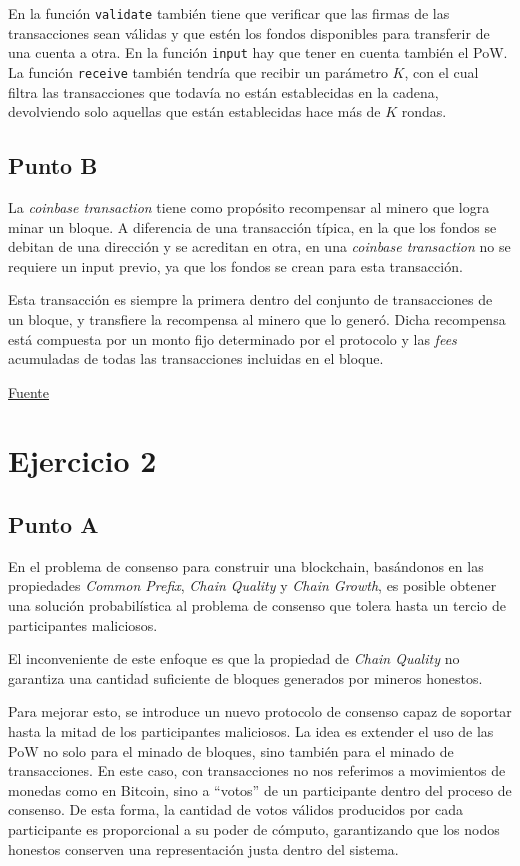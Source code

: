 \documentclass[12pt]{article}
\begin{document}
En la función \texttt{validate} también tiene que verificar que las firmas de las transacciones sean válidas y que estén los fondos disponibles para transferir de una cuenta a otra.  
En la función \texttt{input} hay que tener en cuenta también el PoW.  
La función \texttt{receive} también tendría que recibir un parámetro $K$, con el cual filtra las transacciones que todavía no están establecidas en la cadena, devolviendo solo aquellas que están establecidas hace más de $K$ rondas.  

\subsection{Punto B}

La \emph{coinbase transaction} tiene como propósito recompensar al minero que logra minar un bloque.  
A diferencia de una transacción típica, en la que los fondos se debitan de una dirección y se acreditan en otra, en una \emph{coinbase transaction} no se requiere un input previo, ya que los fondos se crean para esta transacción.

Esta transacción es siempre la primera dentro del conjunto de transacciones de un bloque, y transfiere la recompensa al minero que lo generó. Dicha recompensa está compuesta por un monto fijo determinado por el protocolo y las \emph{fees} acumuladas de todas las transacciones incluidas en el bloque.

\href{https://www.geeksforgeeks.org/computer-networks/what-is-coinbase-transaction/}{Fuente}

\section{Ejercicio 2}

\subsection{Punto A}

En el problema de consenso para construir una blockchain, basándonos en las propiedades \emph{Common Prefix}, \emph{Chain Quality} y \emph{Chain Growth}, es posible obtener una solución probabilística al problema de consenso que tolera hasta un tercio de participantes maliciosos.

El inconveniente de este enfoque es que la propiedad de \emph{Chain Quality} no garantiza una cantidad suficiente de bloques generados por mineros honestos.  

Para mejorar esto, se introduce un nuevo protocolo de consenso capaz de soportar hasta la mitad de los participantes maliciosos.  
La idea es extender el uso de las PoW no solo para el minado de bloques, sino también para el minado de transacciones.  
En este caso, con transacciones no nos referimos a movimientos de monedas como en Bitcoin, sino a “votos” de un participante dentro del proceso de consenso.  
De esta forma, la cantidad de votos válidos producidos por cada participante es proporcional a su poder de cómputo, garantizando que los nodos honestos conserven una representación justa dentro del sistema.
\end{document}
